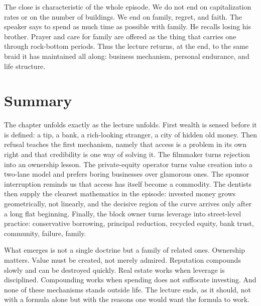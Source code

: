 The close is characteristic of the whole episode. We do not end on capitalization rates or on the number of buildings. We end on family, regret, and faith. The speaker says to spend as much time as possible with family. He recalls losing his brother. Prayer and care for family are offered as the thing that carries one through rock-bottom periods. Thus the lecture returns, at the end, to the same braid it has maintained all along: business mechanism, personal endurance, and life structure.

\section{Summary}

The chapter unfolds exactly as the lecture unfolds. First wealth is sensed before it is defined: a tip, a bank, a rich-looking stranger, a city of hidden old money. Then refusal teaches the first mechanism, namely that access is a problem in its own right and that credibility is one way of solving it. The filmmaker turns rejection into an ownership lesson. The private-equity operator turns value creation into a two-lane model and prefers boring businesses over glamorous ones. The sponsor interruption reminds us that access has itself become a commodity. The dentists then supply the clearest mathematics in the episode: invested money grows geometrically, not linearly, and the decisive region of the curve arrives only after a long flat beginning. Finally, the block owner turns leverage into street-level practice: conservative borrowing, principal reduction, recycled equity, bank trust, community, failure, family.

What emerges is not a single doctrine but a family of related ones. Ownership matters. Value must be created, not merely admired. Reputation compounds slowly and can be destroyed quickly. Real estate works when leverage is disciplined. Compounding works when spending does not suffocate investing. And none of these mechanisms stands outside life. The lecture ends, as it should, not with a formula alone but with the reasons one would want the formula to work.